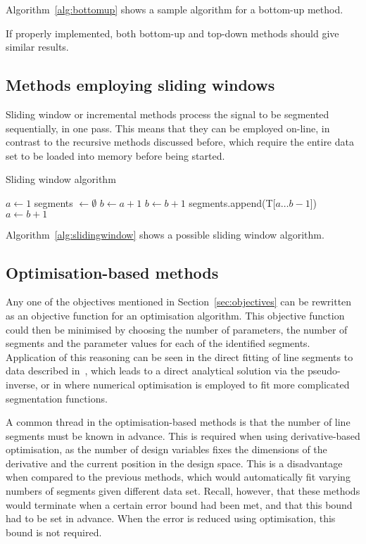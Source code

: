 Algorithm~\ref{alg:bottomup} shows a sample algorithm for a bottom-up
method.

If properly implemented, both bottom-up and top-down methods should
give similar results.

\subsection{Methods employing sliding windows}
Sliding window or incremental methods process the signal to be
segmented sequentially, in one pass.  This means that they can be
employed on-line, in contrast to the recursive methods discussed
before, which require the entire data set to be loaded into memory
before being started.

\begin{algorithm}
  \caption{Sliding window algorithm}
  \label{alg:slidingwindow}
  \begin{algorithmic}
    \State $a \gets 1$
    \State segments $\gets\emptyset$ 
    \State $b\gets a+1$
    \State $b \gets b + 1$
    \EndWhile
    \State segments.append(T[$a\dots b-1$])
    \State $a \gets b + 1$
    \EndWhile
    \EndFunction
  \end{algorithmic}
\end{algorithm}

Algorithm~\ref{alg:slidingwindow} shows a possible sliding window
algorithm.

\subsection{Optimisation-based methods}
Any one of the objectives mentioned in Section~\ref{sec:objectives}
can be rewritten as an objective function for an optimisation
algorithm.  This objective function could then be minimised by
choosing the number of parameters, the number of segments and the
parameter values for each of the identified segments.  Application of
this reasoning can be seen in the direct fitting of line segments to
data described in~\citet{cantoni_optimal_1971}, which leads to a direct
analytical solution via the pseudo-inverse, or in where numerical
optimisation is employed to fit more complicated segmentation
functions.

A common thread in the optimisation-based methods is that the number
of line segments must be known in advance.  This is required when
using derivative-based optimisation, as the number of design variables
fixes the dimensions of the derivative and the current position in the
design space.  This is a disadvantage when compared to the previous
methods, which would automatically fit varying numbers of segments
given different data set.  Recall, however, that these methods would
terminate when a certain error bound had been met, and that this bound
had to be set in advance.  When the error is reduced using
optimisation, this bound is not required.

